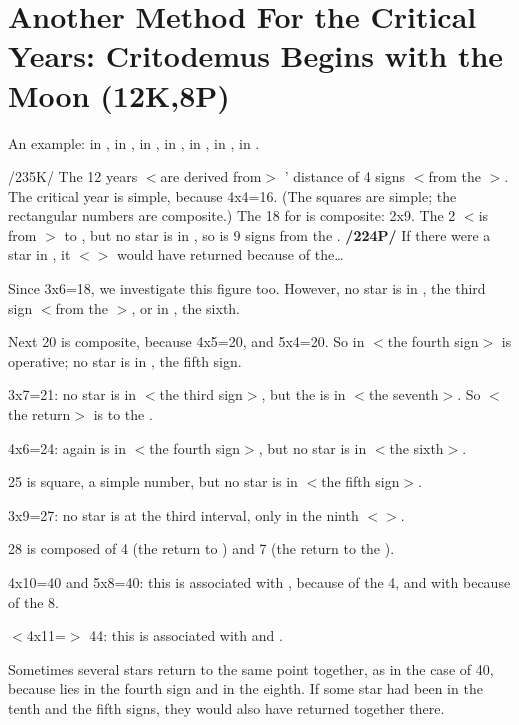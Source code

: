 \section{Another Method For the Critical Years: Critodemus Begins with the Moon (12K,8P)}

An example: \Sun\xspace in \Aquarius, \Moon\xspace in \Leo, \Saturn\xspace in \Cancer, \Jupiter\xspace in \Gemini, \Mars\xspace in \Scorpio, \Venus\xspace in \Aries, \Mercury\xspace in \Pisces. 

/235K/ The 12 years $<$are derived from$>$ \Mars’ distance of 4 signs
$<$from the \Moon$>$. The critical year is simple, because 4x4=16. (The squares are simple; the rectangular numbers are composite.) The 18 for \Venus\xspace is composite: 2x9. The 2 $<$is from \Leo$>$ to \Virgo, but no star is in \Virgo, so \Venus\xspace is 9 signs from the \Moon. \textbf{/224P/} If there were a star in \Virgo, it $<$\Venus$>$ would have returned because of the…

Since 3x6=18, we investigate this figure too. However, no star is in \Libra, the third sign $<$from the \Moon$>$, or in \Capricorn, the sixth.

Next 20 is composite, because 4x5=20, and 5x4=20. So \Mars\xspace in \Scorpio\xspace $<$the fourth sign$>$ is operative; no star is in \Sagittarius, the fifth sign.

3x7=21: no star is in \Libra\xspace $<$the third sign$>$, but the \Sun\xspace is in \Aquarius $<$the seventh$>$. So $<$the return$>$ is to the \Sun.

4x6=24: again \Mars\xspace is in \Scorpio\xspace $<$the fourth sign$>$, but no star is in \Capricorn\xspace $<$the sixth$>$.

25 is square, a simple number, but no star is in \Sagittarius\xspace $<$the fifth sign$>$.

3x9=27: no star is at the third interval, only \Venus\xspace in the ninth $<$\Aries$>$.

28 is composed of 4 (the return to \Mars) and 7 (the return to the \Sun).

4x10=40 and 5x8=40: this is associated with \Mars, because of the 4, and with \Mercury\xspace because of the 8.

$<$4x11=$>$ 44: this is associated with \Mars\xspace and \Jupiter.

 Sometimes several stars return to the same point together, as in the case of 40, because \Mars\xspace lies in the fourth sign and \Mercury\xspace in the eighth. If some star had been in the tenth and the fifth signs, they would also have returned together there.
 
